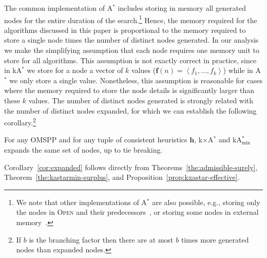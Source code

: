 \documentclass[smallextended]{svjour3}       %
\newcommand{\omspp}{\ac{OMSPP}\xspace}
\newcommand{\astar}{A$^*$\xspace}
\newcommand{\kastar}{kA$^*$\xspace}
\newcommand{\kastarvar}[1]{\textup{kA}$^*_{#1}$\xspace}
\newcommand{\kastarmin}{\kastarvar{\min}}
\newcommand{\kxastar}{k$\times$A$^*$\xspace}
\newcommand{\astari}[1]{A$^*_{#1}$\xspace}
\newcommand{\tuple}[1]{\ensuremath{\left \langle #1 \right \rangle }}
\newcommand{\open}{\textsc{Open}\xspace}
\newcommand{\vect}[1]{\mathbf{#1}}
\begin{document}
The common implementation of \astar 
includes storing  in memory  all generated nodes for the entire duration of the search.\footnote{We note that other implementations of \astar are also possible, e.g., storing only the nodes in \open and their predecessors~\cite{zhou2006breadth,korf2004best}, or storing some nodes in external memory~\cite{zhou2004structured,edelkamp2016external,edelkamp2005external}.}
Hence, the memory required for the algorithms discussed in this paper is proportional to 
the memory required to store a single node times the number of distinct nodes generated. 
In our analysis we make the simplifying assumption that each node requires one memory unit to store for all algorithms. This assumption is not exactly correct in practice, since in \kastar we store for a node a vector of $k$ values ($\vect{f}(n)=\tuple{f_1,\ldots,f_k}$) while in \astar we only store a single value.
Nonetheless, this assumption is reasonable for cases where the memory required to store the node details is significantly larger than these $k$ values. %
The number of distinct nodes generated is strongly related with the number of distinct nodes expanded, for which we can establish the following corollary.\footnote{If $b$ is the branching factor then there are at most $b$ times more generated nodes than expanded nodes.} 
\begin{corollary}
	For any \omspp and for any tuple of consistent heuristics $\vect{h}$, \kxastar and \kastarmin expands the same set of nodes, up to tie breaking.
	\label{cor:expanded}
\end{corollary}
Corollary~\ref{cor:expanded} follows directly from Theorems~\ref{the:admissible-surely}, Theorem~\ref{the:kastarmin-surplus}, and Proposition~\ref{prop:kxastar-effective}. 
\end{document}
